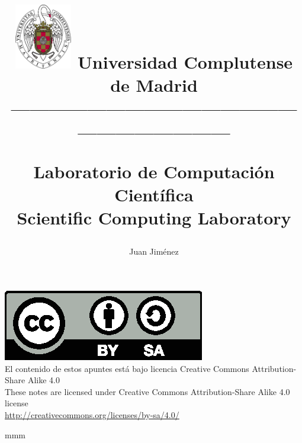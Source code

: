 \documentclass[a4paper,10pt]{book}
\begin{document}
\title{
\begin{flushleft}
\includegraphics[width=2.5cm]{ucm2.pdf} 
Universidad Complutense de Madrid\\
---------------------------------------------------------------------
\end{flushleft}
Laboratorio de Computación Científica\\ Scientific Computing Laboratory}
\author{ Juan Jim\'enez\\}
\maketitle
\vspace*{\fill}
\includegraphics[scale=1]{by-sa.eps}\\
El contenido de estos apuntes está bajo licencia Creative Commons Attribution-Share Alike 4.0\\
These notes are licensed under Creative Commons Attribution-Share Alike 4.0 license\\  
\href{http://creativecommons.org/licenses/by-sa/4.0/}{http://creativecommons.org/licenses/by-sa/4.0/}\\

\bigskip
\tableofcontents
\listoffigures
\listoftables


mmm
%

%
%
%
%
%
%
\printindex
\end{document}
